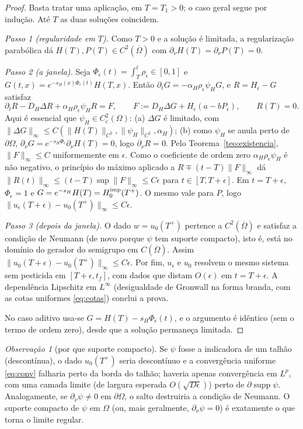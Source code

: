 \documentclass[11pt,a4paper]{article}
\numberwithin{equation}{section}
\theoremstyle{definition}
\theoremstyle{remark}
\newtheorem{observacao}[teorema]{Observação}
\begin{document}
\begin{proof}
Basta tratar uma aplicação, em $T=T_1>0$; o caso geral segue por indução.
Até $T$ as duas soluções coincidem.

\emph{Passo 1 (regularidade em $T$).} Como $T>0$ e a solução é limitada, a regularização
parabólica dá $H(T),P(T)\in C^2(\overline\Omega)$ com $\partial_\nu H(T)=\partial_\nu P(T)=0$.

\emph{Passo 2 (a janela).} Seja $\Phi_\epsilon(t)=\int_T^t\rho_\epsilon\in[0,1]$ e
$G(t,x)=e^{-s_H(x)\Phi_\epsilon(t)}H(T,x)$. Então $\partial_tG=-\alpha_H\rho_\epsilon\psi_H G$, e
$R=H_\epsilon-G$ satisfaz
\[
\partial_tR-D_H\Delta R+\alpha_H\rho_\epsilon\psi_H R=F,\qquad
F:=D_H\Delta G+H_\epsilon(a-bP_\epsilon),\qquad R(T)=0 .
\]
Aqui é essencial que $\psi_H\in C^2_c(\Omega)$: (a) $\Delta G$ é limitado, com
$\|\Delta G\|_\infty\le C(\|H(T)\|_{C^2},\|\psi_H\|_{C^2},\alpha_H)$; (b) como $\psi_H$ se anula
perto de $\partial\Omega$, $\partial_\nu G=e^{-s_H\Phi_\epsilon}\partial_\nu H(T)=0$, logo
$\partial_\nu R=0$. Pelo Teorema~\ref{teo:existencia}, $\|F\|_\infty\le C$ uniformemente em
$\epsilon$. Como o coeficiente de ordem zero $\alpha_H\rho_\epsilon\psi_H$ é não negativo, o
princípio do máximo aplicado a $R\mp(t-T)\|F\|_\infty$ dá
$\|R(t)\|_\infty\le (t-T)\sup\|F\|_\infty\le C\epsilon$ para $t\in[T,T+\epsilon]$.
Em $t=T+\epsilon$, $\Phi_\epsilon=1$ e $G=e^{-s_H}H(T)=H_0^{\rm imp}(T^+)$. O mesmo vale para $P$, logo
$\|u_\epsilon(T+\epsilon)-u_0(T^+)\|_\infty\le C\epsilon$.

\emph{Passo 3 (depois da janela).} O dado $w=u_0(T^+)$ pertence a $C^2(\overline\Omega)$ e satisfaz a
condição de Neumann (de novo porque $\psi$ tem suporte compacto), isto é, está no domínio do
gerador do semigrupo em $C(\overline\Omega)$. Assim
$\|u_0(T+\epsilon)-u_0(T^+)\|_\infty\le C\epsilon$. Por fim, $u_\epsilon$ e $u_0$ resolvem o mesmo
sistema sem pesticida em $[T+\epsilon,t_f]$, com dados que distam $O(\epsilon)$ em $t=T+\epsilon$.
A dependência Lipschitz em $L^\infty$ (desigualdade de Gronwall na forma branda,
com as cotas uniformes \eqref{eq:cotas}) conclui a prova.

No caso aditivo usa-se $G=H(T)-s_H\Phi_\epsilon(t)$, e o argumento é idêntico (sem o termo de
ordem zero), desde que a solução permaneça limitada.
\end{proof}

\begin{observacao}[por que suporte compacto]
Se $\psi$ fosse a indicadora de um talhão (descontínua), o dado $u_0(T^+)$ seria descontínuo e a
convergência uniforme \eqref{eq:conv} falharia perto da borda do talhão; haveria apenas
convergência em $L^p$, com uma camada limite (de largura esperada $O(\sqrt{D\epsilon})$) perto de $\partial\operatorname{supp}\psi$. Analogamente,
se $\partial_\nu\psi\ne0$ em $\partial\Omega$, o salto destruiria a condição de Neumann.
O suporte compacto de $\psi$ em $\Omega$ (ou, mais geralmente, $\partial_\nu\psi=0$) é
exatamente o que torna o limite regular.
\end{observacao}
\end{document}
